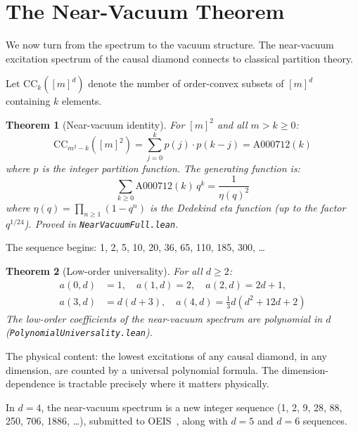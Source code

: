 \documentclass[11pt,letterpaper]{article}
\newtheorem{theorem}{Theorem}
\theoremstyle{remark}
\newcommand{\lean}[1]{\texttt{\small #1}}
\begin{document}
\section{The Near-Vacuum Theorem}
\label{sec:nearvac}

We now turn from the spectrum to the vacuum structure. The near-vacuum
excitation spectrum of the causal diamond connects to classical
partition theory.

Let $\mathrm{CC}_k([m]^d)$ denote the number of order-convex subsets
of $[m]^d$ containing $k$ elements.

\begin{theorem}[Near-vacuum identity]
\label{thm:nearvac}
For $[m]^2$ and all $m > k \geq 0$:
\[
  \mathrm{CC}_{m^2 - k}([m]^2) = \sum_{j=0}^{k} p(j) \cdot p(k - j)
  = \mathrm{A000712}(k)
\]
where $p$ is the integer partition function. The generating function
is:
\[
  \sum_{k \geq 0} \mathrm{A000712}(k) \, q^k = \frac{1}{\eta(q)^2}
\]
where $\eta(q) = \prod_{n \geq 1}(1 - q^n)$ is the Dedekind eta
function (up to the factor $q^{1/24}$). Proved in
\lean{Near\-Vacuum\-Full.lean}.
\end{theorem}

\noindent The sequence begins: 1, 2, 5, 10, 20, 36, 65, 110, 185, 300,
\ldots

\begin{theorem}[Low-order universality]
For all $d \geq 2$:
\begin{align*}
  a(0, d) &= 1, \quad a(1, d) = 2, \quad a(2, d) = 2d + 1, \\
  a(3, d) &= d(d + 3), \quad
  a(4, d) = \tfrac{1}{3}d(d^2 + 12d + 2)
\end{align*}
The low-order coefficients of the near-vacuum spectrum are
polynomial in $d$
(\lean{Polynomial\-Universality\-.lean}).
\end{theorem}

\noindent The physical content: the lowest excitations of any
causal diamond, in any dimension, are counted by a universal
polynomial formula. The dimension-dependence is tractable precisely
where it matters physically.

In $d = 4$, the near-vacuum spectrum is a new integer sequence
(1, 2, 9, 28, 88, 250, 706, 1886, \ldots), submitted to
OEIS~\cite{OEIS}, along with $d = 5$ and $d = 6$ sequences.
\end{document}
